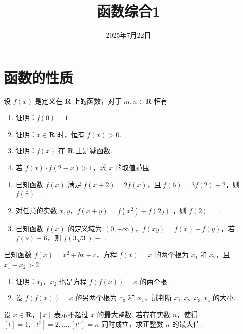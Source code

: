 \documentclass[a4paper , final]{ctexart}
\title{函数综合1}
\date{2025年7月22日}
\newenvironment{problem}[1]{%
  \item #1
  \par
  \vspace{8cm}
}{}
\begin{document}
\maketitle

\section*{函数的性质}

\begin{problems}
    \begin{problem}
    {
    设 $ f(x)$ 是定义在 $ \mathbf{R}$ 上的函数，对于 $m,n\in \mathbf{R}$ 恒有 %
    \begin{enumerate}[label=(\arabic*)]
        \item 证明：$ f(0) = 1$.
        \item 证明：$ x\in\mathbf{R}$ 时，恒有 $ f(x) >0$.
        \item 证明：$ f(x)$ 在 $ \mathbf{R}$ 上是减函数.
        \item 若 $f(x)\cdot f(2-x)>1$，求 $ x$ 的取值范围.
    \end{enumerate}
    }
    \end{problem}

    \begin{problem}
    {
    \begin{enumerate}[label=(\arabic*)]
        \item 已知函数 $ f(x)$ 满足 $f(x+2) = 2f(x)$，且 $f(6) = 3f(2)+2$，则 $f(8)=$ \underline{\hspace{1.5cm}}.
        \item 对任意的实数 $x,y$，$f(x+y)=f(x^2)+f(2y)$ ，则 $f(2)=$ \underline{\hspace{1.5cm}}.
        \item 已知函数 $ f(x)$ 的定义域为 $ (0,+\infty)$，$f(xy)=f(x)+f(y)$，若 $f(9)=6$，则 $f(3\sqrt{3})=$ \underline{\hspace{1.5cm}}.
    \end{enumerate}
    }
    \end{problem}

    \begin{problem}
    {
    已知函数 $ f(x) = x^2 +bx +c$，方程 $ f(x) = x$ 的两个根为 $ x_1$ 和 $ x_2$，且 $ x_1-x_2>2$.
    \begin{enumerate}[label=(\arabic*)]
        \item 证明：$ x_1$，$ x_2$ 也是方程 $ f(f(x)) =x$ 的两个根.
        \item 设 $ f(f(x)) = x$ 的另两个根为 $ x_3$ 和 $ x_4$，试判断 $ x_1, x_2, x_3, x_4$ 的大小.
    \end{enumerate}
    }
    \end{problem}

    \begin{problem}
    {
    设 $x\in \mathbf{R}$，$[x]$ 表示不超过 $ x$ 的最大整数. 若存在实数 $ n$，使得$ [t] = 1 , [t^2] = 2 , \ldots , [t^n] = n$ 同时成立，求正整数 $ n$ 的最大值.
    }
    \end{problem}

\end{problems}
\end{document}

